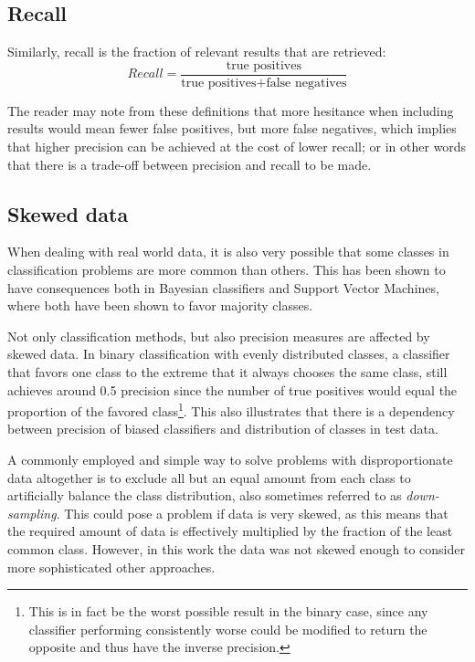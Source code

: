\documentclass[a4paper,11pt]{kth-mag}
\begin{document}
\subsection{Recall}
Similarly, recall is the fraction of relevant results that are retrieved:
$$Recall = \frac{\text {true positives}}{\text{true positives} + \text{false negatives}}$$

The reader may note from these definitions that more hesitance when including results would mean fewer false positives, but more false negatives, which implies that higher precision can be achieved at the cost of lower recall; or in other words that there is a trade-off between precision and recall to be made.


\subsection{Skewed data}
\label{subsec:bias}
When dealing with real world data, it is also very possible that some classes in classification problems are more common than others. This has been shown to have consequences both in Bayesian classifiers\cite{rennie2003bias} and Support Vector Machines\cite{svm_bias}, where both have been shown to favor majority classes\cite{rennie2003bias, svm_bias}.

Not only classification methods, but also precision measures are affected by skewed data. In binary classification with evenly distributed classes, a classifier that favors one class to the extreme that it always chooses the same class, still achieves around 0.5 precision since the number of true positives would equal the proportion of the favored class\footnote{This is in fact be the worst possible result in the binary case, since any classifier performing consistently worse could be modified to return the opposite and thus have the inverse precision.}. This also illustrates that there is a dependency between precision of biased classifiers and distribution of classes in test data.

A commonly employed and simple way to solve problems with disproportionate data altogether is to exclude all but an equal amount from each class to artificially balance the class distribution, also sometimes referred to as \emph{down-sampling}\cite{provost2000machine}. This could pose a problem if data is very skewed, as this means that the required amount of data is effectively multiplied by the fraction of the least common class. However, in this work the data was not skewed enough to consider more sophisticated other approaches.
\end{document}
